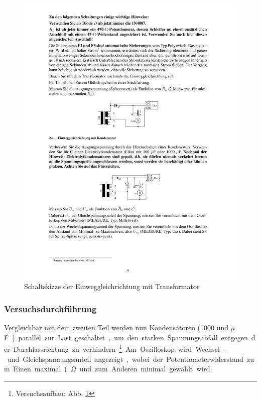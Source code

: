 \documentclass[12pt,a4paper]{article}
\begin{document}
\begin{figure}[H] 
  \centering
    \includegraphics[trim = 10mm 80mm 10mm 170mm, clip, scale = 1]{ep2_14[Page9].pdf}
  	\caption[Schaltskizze der Einweggleichrichtung mit Transformator]{Schaltskizze der Einweggleichrichtung mit Transformator\footnotemark}
  \label{fig:2_5}
\end{figure}

\subsubsection{Versuchsdurchführung}
Vergleichbar mit dem zweiten Teil werden nun Kondensatoren (1000 und \unit[100]{$\mu$F}) parallel zur Last geschaltet, um den starken Spannungsabfall entgegen der Durchlassrichtung zu verhindern \footnote{Versuchsaufbau: Abb. \ref{fig:2_5}}. Am Oszilloskop wird Wechsel- und Gleichspannungsanteil angezeigt, wobei der Potentiometerwiderstand zum Einen maximal (\unit[517]{$\Omega$} und zum Anderen minimal gewählt wird.
\end{document}
